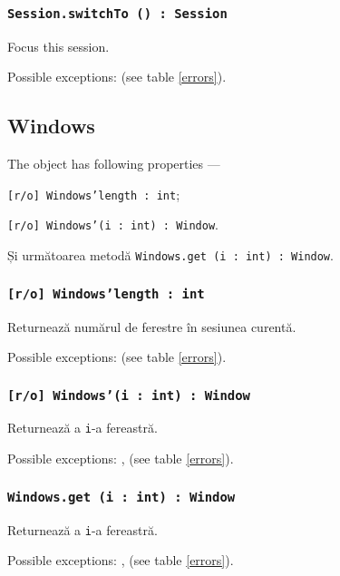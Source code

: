 \subsubsection{\texttt{Session.switchTo () : Session}}

Focus this session.

Possible exceptions:  (see table \ref{errors}).

\subsection{{\color{orange} Windows}}

The object \windows{} has following properties —
\begin{icItems}
	\item \texttt{[r/o] Windows'length : int};
	\item \texttt{[r/o] Windows'(i : int) : Window}.
\end{icItems}

Și următoarea metodă \texttt{Windows.get (i : int) : Window}.

\subsubsection{\texttt{[r/o] Windows'length : int}}

Returnează numărul de ferestre în sesiunea curentă.

Possible exceptions:  (see table \ref{errors}).

\subsubsection{\texttt{[r/o] Windows'(i : int) : Window}}

Returnează a \texttt{i}-a fereastră.

Possible exceptions: ,  (see table \ref{errors}).

\subsubsection{\texttt{Windows.get (i : int) : Window}}

Returnează a \texttt{i}-a fereastră.

Possible exceptions: ,  (see table \ref{errors}).

